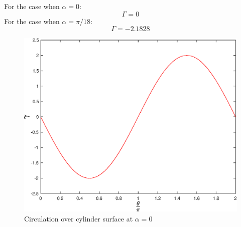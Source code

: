 


  

  

  

\justify
\vspace{1cm}
For the case when $\alpha = 0$:
\[
\Gamma = 0 
\]
\vspace{1cm}
For the case when $\alpha = \pi/18$:
\[
\Gamma = -2.1828
\]

\begin{figure}[htbp]
\centering
\includegraphics[scale=0.65]{graphs/e5g1.eps}
\caption{Circulation over cylinder surface at $\alpha = 0$}
\label{e5g1}
\end{figure}

